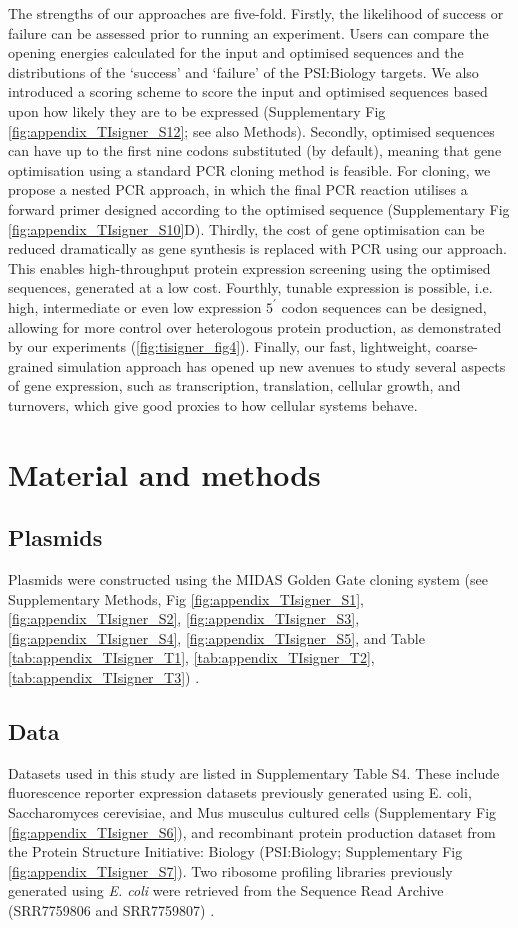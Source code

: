 The strengths of our approaches are five-fold. Firstly, the likelihood of success or failure can be assessed prior to running an experiment. Users can compare the opening energies calculated for the input and optimised sequences and the distributions of the ‘success’ and ‘failure’ of the PSI:Biology targets. We also introduced a scoring scheme to score the input and optimised sequences based upon how likely they are to be expressed (Supplementary Fig \ref{fig:appendix_TIsigner_S12}; see also Methods). Secondly, optimised sequences can have up to the first nine codons substituted (by default), meaning that gene optimisation using a standard PCR cloning method is feasible. For cloning, we propose a nested PCR approach, in which the final PCR reaction utilises a forward primer designed according to the optimised sequence \cite{Sambrook2001-ki} (Supplementary Fig \ref{fig:appendix_TIsigner_S10}D). Thirdly, the cost of gene optimisation can be reduced dramatically as gene synthesis is replaced with PCR using our approach. This enables high-throughput protein expression screening using the optimised sequences, generated at a low cost. Fourthly, tunable expression is possible, i.e. high, intermediate or even low expression $5^{\prime}$ codon sequences can be designed, allowing for more control over heterologous protein production, as demonstrated by our experiments (\ref{fig:tisigner_fig4}). Finally, our fast, lightweight, coarse-grained simulation approach has opened up new avenues to study several aspects of gene expression, such as transcription, translation, cellular growth, and turnovers, which give good proxies to how cellular systems behave.


\section{Material and methods}
\subsection{Plasmids}
Plasmids were constructed using the MIDAS Golden Gate cloning system (see Supplementary Methods, Fig \ref{fig:appendix_TIsigner_S1}, \ref{fig:appendix_TIsigner_S2}, \ref{fig:appendix_TIsigner_S3}, \ref{fig:appendix_TIsigner_S4}, \ref{fig:appendix_TIsigner_S5}, and Table \ref{tab:appendix_TIsigner_T1}, \ref{tab:appendix_TIsigner_T2}, \ref{tab:appendix_TIsigner_T3}) \cite{Van_Dolleweerd2018-sg}.

\subsection{Data}
Datasets used in this study are listed in Supplementary Table S4. These include fluorescence reporter expression datasets previously generated using E. coli, Saccharomyces cerevisiae, and Mus musculus cultured cells (Supplementary Fig \ref{fig:appendix_TIsigner_S6}), and recombinant protein production dataset from the Protein Structure Initiative: Biology (PSI:Biology; Supplementary Fig \ref{fig:appendix_TIsigner_S7}). Two ribosome profiling libraries previously generated using \textit{E. coli} were retrieved from the Sequence Read Archive (SRR7759806 and SRR7759807) \cite{Mohammad2019-gf}.

